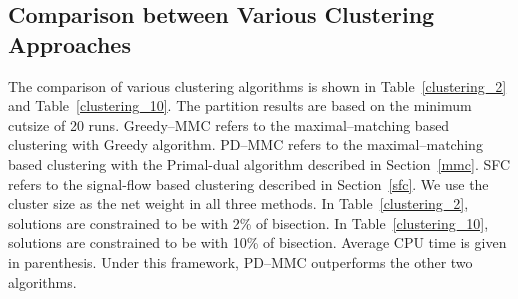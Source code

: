 \documentclass[journal]{IEEEtran}
\begin{document}

\subsection{Comparison between Various Clustering Approaches}
The comparison of various clustering algorithms is shown in
Table~\ref{clustering_2} and Table~\ref{clustering_10}. 
The partition results are based on the minimum cutsize of 20 runs.
Greedy--MMC refers to the maximal--matching based
clustering with Greedy algorithm. PD--MMC refers to the
maximal--matching based clustering with the Primal-dual algorithm
described in Section~\ref{mmc}. SFC refers to the
signal-flow based clustering described in Section~\ref{sfc}.
We use the cluster size as the net weight in all three methods. In
Table~\ref{clustering_2}, solutions are constrained to be with 2\% of
bisection. In Table~\ref{clustering_10}, solutions are constrained to
be with 10\% of bisection. Average CPU time is given in parenthesis.
Under this framework, PD--MMC outperforms the other two algorithms.
\end{document}
